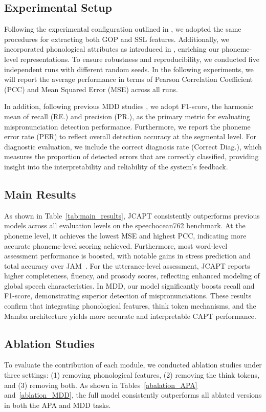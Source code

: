 \documentclass{Interspeech}
\begin{document}
\subsection{Experimental Setup}
Following the experimental configuration outlined in \cite{he2024jam}, we adopted the same procedures for extracting both GOP and SSL features. Additionally, we incorporated phonological attributes as introduced in \cite{Shahin24-PhonologicalMD}, enriching our phoneme-level representations. To ensure robustness and reproducibility, we conducted five independent runs with different random seeds. In the following experiments, we will report the average performance in terms of Pearson Correlation Coefficient (PCC) and Mean Squared Error (MSE) across all runs. 

In addition, following previous MDD studies \cite{li2017mispronunciation}, we adopt F1-score, the harmonic mean of recall (RE.) and precision (PR.), as the primary metric for evaluating mispronunciation detection performance. Furthermore, we report the phoneme error rate (PER) to reflect overall detection accuracy at the segmental level. For diagnostic evaluation, we include the correct diagnosis rate (Correct Diag.), which measures the proportion of detected errors that are correctly classified, providing insight into the interpretability and reliability of the system's feedback. 


\subsection{Main Results}
As shown in Table~\ref{tab:main_results}, JCAPT consistently outperforms previous models across all evaluation levels on the speechocean762 benchmark. At the phoneme level, it achieves the lowest MSE and highest PCC, indicating more accurate phoneme-level scoring achieved. Furthermore, most word-level assessment performance is boosted, with notable gains in stress prediction and total accuracy over JAM~\cite{he2024jam}. For the utterance-level assessment, JCAPT reports higher completeness, fluency, and prosody scores, reflecting enhanced modeling of global speech characteristics. In MDD, our model significantly boosts recall and F1-score, demonstrating superior detection of mispronunciations. These results confirm that integrating phonological features, think token mechanisms, and the Mamba architecture yields more accurate and interpretable CAPT performance.

\subsection{Ablation Studies}
To evaluate the contribution of each module, we conducted ablation studies under three settings: (1) removing phonological features, (2) removing the think tokens, and (3) removing both. As shown in Tables~\ref{abalation_APA} and~\ref{ablation_MDD}, the full model consistently outperforms all ablated versions in both the APA and MDD tasks.
\end{document}
